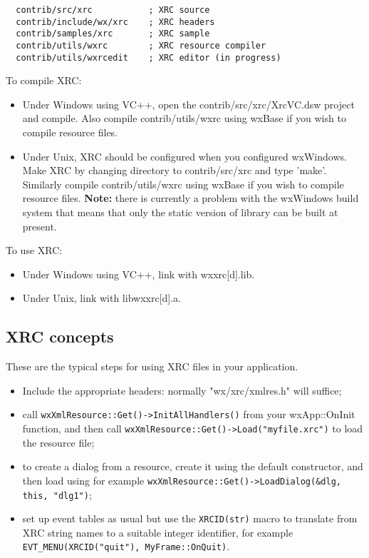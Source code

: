 \begin{verbatim}
  contrib/src/xrc           ; XRC source
  contrib/include/wx/xrc    ; XRC headers
  contrib/samples/xrc       ; XRC sample
  contrib/utils/wxrc        ; XRC resource compiler
  contrib/utils/wxrcedit    ; XRC editor (in progress)
\end{verbatim}

To compile XRC:

\begin{itemize}\itemsep=0pt
\item Under Windows using VC++, open the contrib/src/xrc/XrcVC.dsw project
and compile. Also compile contrib/utils/wxrc using wxBase if you wish to compile
resource files.
\item Under Unix, XRC should be configured when you configured
wxWindows. Make XRC by changing directory to contrib/src/xrc and
type 'make'.  Similarly compile contrib/utils/wxrc using wxBase if you wish to compile
resource files. {\bf Note:} there is currently a
problem with the wxWindows build system that means that
only the static version of library can be built at present.
\end{itemize}

To use XRC:

\begin{itemize}\itemsep=0pt
\item Under Windows using VC++, link with wxxrc[d].lib.
\item Under Unix, link with libwxxrc[d].a.
\end{itemize}

\subsection{XRC concepts}\label{xrcconcepts}

These are the typical steps for using XRC files in your application.

\begin{itemize}\itemsep=0pt
\item Include the appropriate headers: normally "wx/xrc/xmlres.h" will suffice;
\item call \verb$wxXmlResource::Get()->InitAllHandlers()$ from your wxApp::OnInit function,
and then call \verb$wxXmlResource::Get()->Load("myfile.xrc")$ to load the resource file;
\item to create a dialog from a resource, create it using the default constructor, and then
load using for example \verb$wxXmlResource::Get()->LoadDialog(&dlg, this, "dlg1")$;
\item set up event tables as usual but use the \verb$XRCID(str)$ macro to translate from XRC string names
to a suitable integer identifier, for example \verb$EVT_MENU(XRCID("quit"), MyFrame::OnQuit)$.
\end{itemize}

